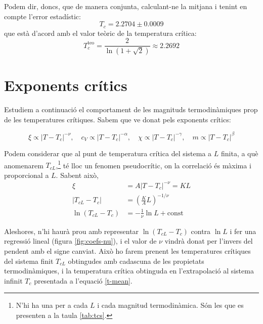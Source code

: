 \documentclass[a4paper]{article}
\begin{document}
Podem dir, doncs, que de manera conjunta, calculant-ne la mitjana i tenint en compte l'error estadístic:
\begin{equation} \label{t-mean}
    T_c = 2.2704 \pm 0.0009
\end{equation}
que està d'acord amb el valor teòric de la temperatura crítica:
\begin{equation*} \label{t-teo}
    T_c^\text{teo} = \frac{2}{\ln(1+\sqrt{2})} \approx 2.2692
\end{equation*}

\section{Exponents crítics}

Estudiem a continuació el comportament de les magnituds termodinàmiques prop de les temperatures crítiques. Sabem que ve donat pels exponents crítics:

\begin{equation*}
    \xi \propto \left| T-T_c \right|^{-\nu},\quad
    c_V \propto \left| T-T_c \right|^{-\alpha},\quad
    \chi \propto \left| T-T_c \right|^{-\gamma},\quad
    m \propto \left| T-T_c \right|^{\beta}
\end{equation*}

Podem considerar que al punt de temperatura crítica del sistema a $L$ finita, a què anomenarem $T_{cL}$,\footnote{N'hi ha una per a cada $L$ i cada magnitud termodinàmica. Són les que es presenten a la taula \ref{tab:tcs}.} té lloc un fenomen pseudocrític, on la correlació és màxima i proporcional a $L$. Sabent això,
\begin{align*}
    \xi &= A \left| T-T_c \right|^{-\nu} = KL \\
    \left|T_{cL}-T_c \right| &= \left(\frac{K}{A} L \right)^{-1/\nu} \\
    \ln \left(T_{cL} - T_c \right) &= -\frac{1}{\nu} \ln L + \text{const}
\end{align*}

Aleshores, n'hi haurà prou amb representar $\ln(T_{cL}-T_c)$ contra $\ln L$ i fer una regressió lineal (figura \ref{fig:coefs-nu}), i el valor de $\nu$ vindrà donat per l'invers del pendent amb el signe canviat. Això ho farem prenent les temperatures crítiques del sistema finit $T_{cL}$ obtingudes amb cadascuna de les propietats termodinàmiques, i la temperatura crítica obtinguda en l'extrapolació al sistema infinit $T_c$ presentada a l'equació \eqref{t-mean}.
\end{document}
